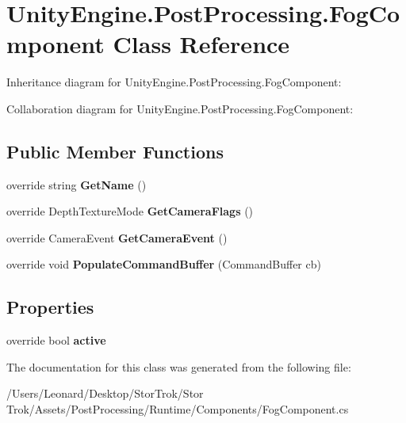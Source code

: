 \hypertarget{class_unity_engine_1_1_post_processing_1_1_fog_component}{}\section{Unity\+Engine.\+Post\+Processing.\+Fog\+Component Class Reference}
\label{class_unity_engine_1_1_post_processing_1_1_fog_component}


Inheritance diagram for Unity\+Engine.\+Post\+Processing.\+Fog\+Component\+:


Collaboration diagram for Unity\+Engine.\+Post\+Processing.\+Fog\+Component\+:
\subsection*{Public Member Functions}
\begin{DoxyCompactItemize}
\item 
\mbox{\label{class_unity_engine_1_1_post_processing_1_1_fog_component_acf525749b7d7e54b04a111681b386628}} 
override string {\bfseries Get\+Name} ()
\item 
\mbox{\label{class_unity_engine_1_1_post_processing_1_1_fog_component_a91738868bb041aaecca8adcf75c148c3}} 
override Depth\+Texture\+Mode {\bfseries Get\+Camera\+Flags} ()
\item 
\mbox{\label{class_unity_engine_1_1_post_processing_1_1_fog_component_a6b9fae58f8772759a33c8050ea443195}} 
override Camera\+Event {\bfseries Get\+Camera\+Event} ()
\item 
\mbox{\label{class_unity_engine_1_1_post_processing_1_1_fog_component_a069c63fdf3cc8cc505508db2671948ac}} 
override void {\bfseries Populate\+Command\+Buffer} (Command\+Buffer cb)
\end{DoxyCompactItemize}
\subsection*{Properties}
\begin{DoxyCompactItemize}
\item 
\mbox{\label{class_unity_engine_1_1_post_processing_1_1_fog_component_aea59b9db2bd9686b92d88154abc4de3c}} 
override bool {\bfseries active}
\end{DoxyCompactItemize}


The documentation for this class was generated from the following file\+:\begin{DoxyCompactItemize}
\item 
/\+Users/\+Leonard/\+Desktop/\+Stor\+Trok/\+Stor Trok/\+Assets/\+Post\+Processing/\+Runtime/\+Components/Fog\+Component.\+cs\end{DoxyCompactItemize}

